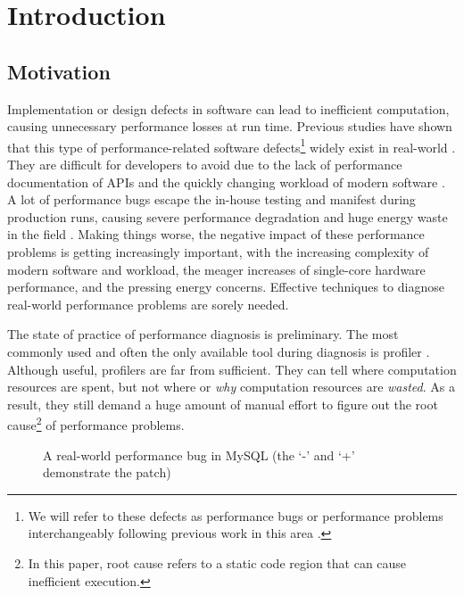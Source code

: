 \section{Introduction}



\subsection{Motivation}




Implementation or design defects in software can lead to inefficient 
computation, causing unnecessary performance losses at run time.
Previous studies have shown that this type of performance-related software
defects\footnote{We will refer to these defects as performance bugs
or performance problems interchangeably following previous work in this 
area \cite{PerfBug,Alabama,perf.fse10}.} 
widely exist in real-world
\cite{s2e,PerfBug,perf.fse10,rily.perftest,perfantipattern}.
They are difficult for developers to avoid due to the lack of 
performance documentation of APIs and the quickly changing workload of
modern software \cite{PerfBug}.
A lot of performance bugs escape the in-house testing and manifest during
production runs, causing severe performance degradation and huge energy 
waste in the field \cite{PerfBug}. Making things worse, the negative impact of 
these performance problems is getting increasingly important,
with the increasing complexity of modern software and workload,
the meager increases of single-core hardware performance, and the 
pressing energy concerns.
Effective techniques to diagnose real-world performance problems 
are sorely needed.



The state of practice of performance diagnosis is preliminary.
The most commonly used and often the only available tool during
diagnosis is profiler \cite{oprofile,gprof}. 
Although useful, profilers are far from sufficient.
They can tell where
computation resources are spent, but not where or \textit{why} computation 
resources are 
\textit{wasted}.
As a result, they still demand a huge amount of manual effort to figure
out the root cause\footnote{In this paper, root cause refers to a static code
region that can cause inefficient execution.} of performance problems.


\begin{figure}[h]
\centering

\caption{A real-world performance bug in MySQL (the `-' and `+' demonstrate the patch)}
\label{fig:MySQLintro}
\end{figure}


